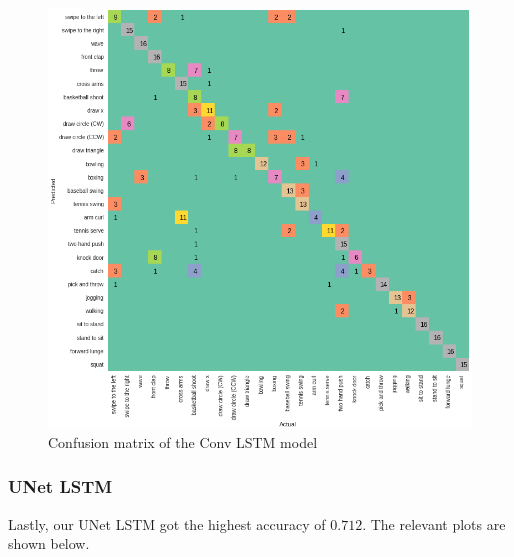 \documentclass[conference]{IEEEtran}
\begin{document}
\begin{figure}[H]
\begin{center}
\includegraphics[scale=0.3]{conv_LSTM/conv_lstm_confusion_matrix.png}
\end{center}
\caption{\label{fig:confusion_matrix_conv_LSTM} 
Confusion matrix of the Conv LSTM model}
\end{figure}

\subsubsection{UNet LSTM}
Lastly, our UNet LSTM got the highest accuracy of $0.712$. The relevant plots are shown below.
\end{document}
